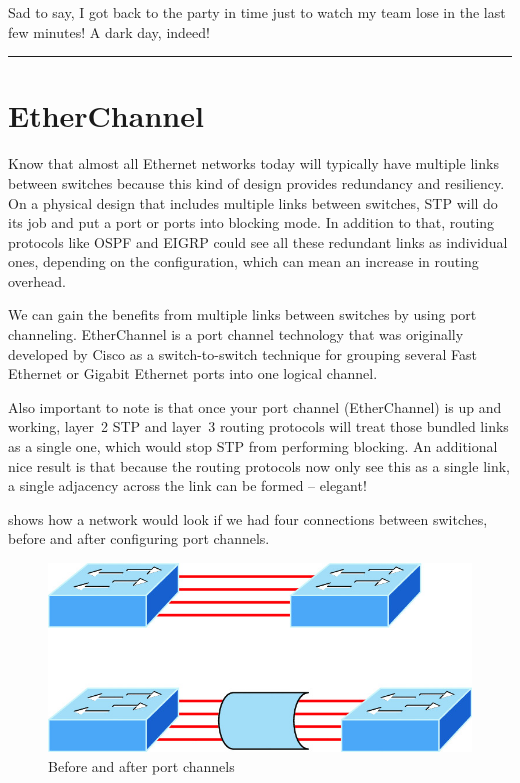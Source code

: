 \documentclass[b5paper,11pt]{memoir}
\begin{document}
Sad to say, I got back to the party in time just to watch my team lose
in the last few minutes! A dark day, indeed!

\begin{center}\rule{0.5\linewidth}{0.5pt}\end{center}



\section{EtherChannel}
\label{sec:etherchannel}

Know that almost all Ethernet networks today will typically have
multiple links between switches because this kind of design provides
redundancy and resiliency. On a physical design that includes multiple
links between switches, STP will do its job and put a port or ports into
blocking mode. In addition to that, routing protocols like OSPF and
EIGRP could see all these redundant links as individual ones, depending
on the configuration, which can mean an increase in routing overhead.

We can gain the benefits from multiple links between switches by using
port channeling. EtherChannel is a port channel technology that was
originally developed by Cisco as a switch-to-switch technique for
grouping several Fast Ethernet or Gigabit Ethernet ports into one
logical channel.

Also important to note is that once your port channel (EtherChannel) is
up and working, layer~2 STP and layer~3 routing protocols will treat
those bundled links as a single one, which would stop STP from
performing blocking. An additional nice result is that because the
routing protocols now only see this as a single link, a single adjacency
across the link can be formed -- elegant!

 shows how a network would look if we had four connections between switches, before and after configuring port channels.

\begin{figure}
   \centering
   \includegraphics[width=.5\textwidth]{images/c15f020.jpg}
   \caption{Before and after port channels}
   \label{fig:etherchannel-before-after}
\end{figure}
\end{document}
